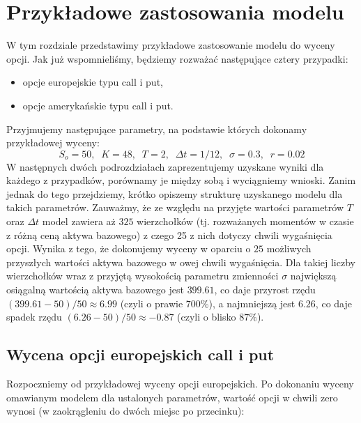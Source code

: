 \documentclass[
]{article}
\begin{document}
\hypertarget{przykux142adowe-zastosowania-modelu}{%
\section{Przykładowe zastosowania
modelu}\label{przykux142adowe-zastosowania-modelu}}

W tym rozdziale przedstawimy przykładowe zastosowanie modelu do wyceny
opcji. Jak już wspomnieliśmy, będziemy rozważać następujące cztery
przypadki:

\begin{itemize}
\item
  opcje europejskie typu call i put,
\item
  opcje amerykańskie typu call i put.
\end{itemize}

Przyjmujemy następujące parametry, na podstawie których dokonamy
przykładowej wyceny: \[
S_o = 50,\;\; K = 48,\;\; T = 2,\;\; \Delta t = 1/12,\;\; \sigma = 0.3,\;\; r = 0.02
\] W następnych dwóch podrozdziałach zaprezentujemy uzyskane wyniki dla
każdego z przypadków, porównamy je między sobą i wyciągniemy wnioski.
Zanim jednak do tego przejdziemy, krótko opiszemy strukturę uzyskanego
modelu dla takich parametrów. Zauważmy, że ze względu na przyjęte
wartości parametrów \(T\) oraz \(\Delta t\) model zawiera aż \(325\)
wierzchołków (tj. rozważanych momentów w czasie z różną ceną aktywa
bazowego) z czego 25 z nich dotyczy chwili wygaśnięcia opcji. Wynika z
tego, że dokonujemy wyceny w oparciu o \(25\) możliwych przyszłych
wartości aktywa bazowego w owej chwili wygaśnięcia. Dla takiej liczby
wierzchołków wraz z przyjętą wysokością parametru zmienności \(\sigma\)
największą osiągalną wartością aktywa bazowego jest \(399.61\), co daje
przyrost rzędu \((399.61 - 50)/50 \approx 6.99\) (czyli o prawie
\(700 \%\)), a najmniejszą jest \(6.26\), co daje spadek rzędu
\((6.26 - 50)/50 \approx - 0.87\) (czyli o blisko \(87\%\)).

\hypertarget{wycena-opcji-europejskich-call-i-put}{%
\subsection{Wycena opcji europejskich call i
put}\label{wycena-opcji-europejskich-call-i-put}}

Rozpoczniemy od przykładowej wyceny opcji europejskich. Po dokonaniu
wyceny omawianym modelem dla ustalonych parametrów, wartość opcji w
chwili zero wynosi (w zaokrągleniu do dwóch miejsc po przecinku):
\end{document}
